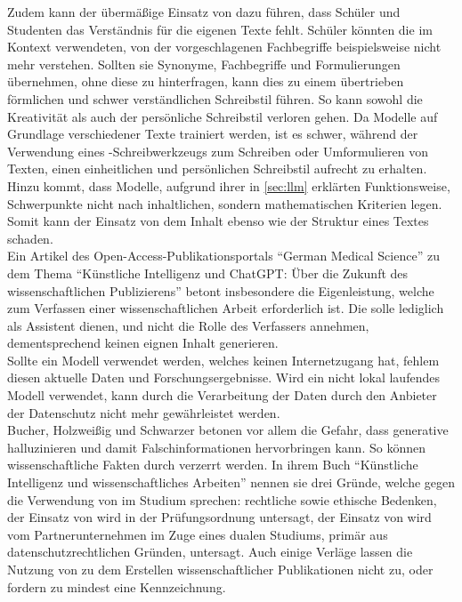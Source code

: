 \documentclass[../main.tex]{subfiles}
\begin{document}
Zudem kann der übermäßige Einsatz von  dazu führen, dass Schüler und Studenten das Verständnis für die eigenen Texte fehlt. Schüler könnten die im 
Kontext verwendeten, von der  vorgeschlagenen Fachbegriffe beispielsweise nicht mehr verstehen. Sollten sie Synonyme, Fachbegriffe und Formulierungen 
übernehmen, ohne diese zu hinterfragen, kann dies zu einem übertrieben förmlichen und schwer verständlichen Schreibstil führen\cite{teachers}. 
So kann sowohl die Kreativität als auch der persönliche Schreibstil verloren gehen. Da  Modelle auf Grundlage verschiedener Texte trainiert werden, ist es
schwer, während der Verwendung eines -Schreibwerkzeugs zum Schreiben oder Umformulieren von Texten, einen einheitlichen und persönlichen Schreibstil aufrecht zu erhalten\cite{creativeWriting}. Hinzu kommt,
dass  Modelle, aufgrund ihrer in \autoref{sec:llm} erklärten Funktionsweise, Schwerpunkte nicht nach inhaltlichen, sondern mathematischen Kriterien legen\cite{berensBolk}. Somit kann der 
Einsatz von  dem Inhalt ebenso wie der Struktur eines Textes schaden.\\

Ein Artikel des Open-Access-Publikationsportals "`German Medical Science"' zu dem Thema "`Künstliche Intelligenz und ChatGPT: Über die Zukunft des wissenschaftlichen Publizierens"'
betont insbesondere die Eigenleistung, welche zum Verfassen einer wissenschaftlichen Arbeit erforderlich ist. Die  solle lediglich als Assistent dienen, und
nicht die Rolle des Verfassers annehmen, dementsprechend keinen eignen Inhalt generieren. \\ Sollte ein  Modell verwendet werden, welches keinen Internetzugang hat,
fehlem diesen aktuelle Daten und Forschungsergebnisse. Wird ein nicht lokal laufendes Modell verwendet, kann durch die Verarbeitung der Daten durch den  Anbieter
der Datenschutz nicht mehr gewährleistet werden.\cite{ZukunftWissenschaftlichesPublizieren} \\ Bucher, Holzweißig und Schwarzer betonen vor allem die Gefahr, dass 
generative  halluzinieren und damit Falschinformationen hervorbringen kann. So können wissenschaftliche Fakten durch  verzerrt werden. In ihrem Buch "`Künstliche Intelligenz und wissenschaftliches Arbeiten"' nennen sie drei 
Gründe, welche gegen die Verwendung von  im Studium sprechen: rechtliche sowie ethische Bedenken, der Einsatz von  wird in der Prüfungsordnung untersagt, 
der Einsatz von  wird vom Partnerunternehmen im Zuge eines dualen Studiums, primär aus datenschutzrechtlichen Gründen, untersagt.\cite{BucherSchwarzerHolzwweißig} Auch einige Verläge lassen 
die Nutzung von  zu dem Erstellen wissenschaftlicher Publikationen nicht zu, oder fordern zu mindest eine Kennzeichnung\cite{ZukunftWissenschaftlichesPublizieren}. 
\end{document}
